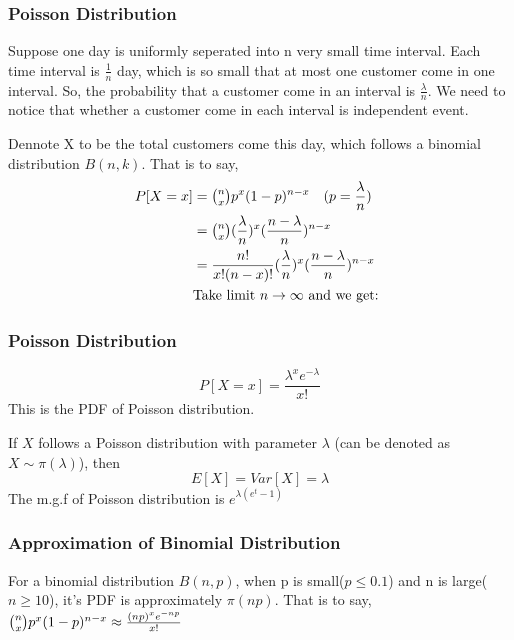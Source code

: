 \documentclass{beamer}
\begin{document}
\begin{frame}
    \frametitle{Poisson Distribution}
    Suppose one day is uniformly seperated into n very small time interval. Each time interval is $\frac{1}{n}$ day, which is so small that at most one customer come in one interval. So, the probability that a customer come in an interval is $\frac{\lambda}{n}$. We need to notice that whether a customer come in each interval is independent event.\par
    Dennote X to be the total customers come this day, which follows a binomial distribution $B(n,k)$. That is to say, 
    \begin{align*}
        P[X=x]& =\tbinom{n}{x}p^{x}(1-p)^{n-x}\quad (p=\frac{\lambda}{n})\\
        & =\tbinom{n}{x}(\frac{\lambda}{n})^x(\frac{n-\lambda}{n})^{n-x}\\
        & =\frac{n!}{x!(n-x)!}(\frac{\lambda}{n})^x(\frac{n-\lambda}{n})^{n-x}\\
        & \text{Take limit }n\rightarrow \infty \text{ and we get: }\\
    \end{align*}
\end{frame}

\begin{frame}
    \frametitle{Poisson Distribution}
    \[P[X=x]=\frac{\lambda^x e^{-\lambda}}{x!}\]
    This is the PDF of Poisson distribution.\par
    \vspace{0.3cm}
    If $X$ follows a Poisson distribution with parameter $\lambda$ (can be denoted as $X\sim \pi(\lambda)$), then
    \[E[X]=Var[X]=\lambda\]
    The m.g.f of Poisson distribution is $e^{\lambda (e^t-1)}$

\end{frame}

\begin{frame}
    \frametitle{Approximation of Binomial Distribution}
    For a binomial distribution $B(n,p)$, when p is small($p\leq 0.1$) and n is large($n \geq 10$), it's PDF is approximately $\pi(np)$. That is to say, $\tbinom{n}{x}p^{x}(1-p)^{n-x}\approx \frac{(np)^x e^{-np}}{x!}$

\end{frame}
\end{document}
